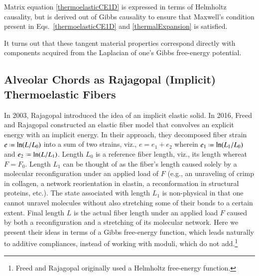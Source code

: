 Matrix equation \ref{thermoelasticCE1D} is expressed in terms of Helmholtz causality, but is derived out of Gibbs causality to ensure that Maxwell's condition present in Eqs.~\ref{thermoelasticCE1D} and \ref{thermalExpansion} is satisfied.

It turns out that these tangent material properties correspond directly with components acquired from the Laplacian of one's Gibbs free-energy potential.

\subsection{Alveolar Chords as Rajagopal (Implicit) Thermoelastic Fibers}

In 2003, Rajagopal \cite{Rajagopal03} introduced the idea of an implicit elastic solid.  In 2016, Freed and Rajagopal \cite{FreedRajagopal16} constructed an elastic fiber model that convolves an explicit energy with an implicit energy.  In their approach, they decomposed fiber strain $e \defeq \ln (L / L_0)$ into a sum of two strains, viz., $e = e_1 + e_2$ wherein $e_1 \defeq \ln (L_1 / L_0)$ and $e_2 \defeq \ln (L / L_1)$.  Length $L_0$ is a reference fiber length, viz., its length whereat $F = F_0$.  Length $L_1$ can be thought of as the fiber's length caused solely by a molecular reconfiguration under an applied load of $F$ (e.g., an unraveling of crimp in collagen, a network reorientation in elastin, a reconformation in structural proteins, etc.).  The state associated with length $L_1$ is non-physical in that one cannot unravel molecules without also stretching some of their bonds to a certain extent.  Final length $L$ is the actual fiber length under an applied load $F$ caused by both a reconfiguration and a stretching of its molecular network.  Here we present their ideas in terms of a Gibbs free-energy function, which leads naturally to additive compliances, instead of working with moduli, which do not add.\footnote{%
    Freed and Rajagopal \cite{FreedRajagopal16} originally used a Helmholtz free-energy function.
}

